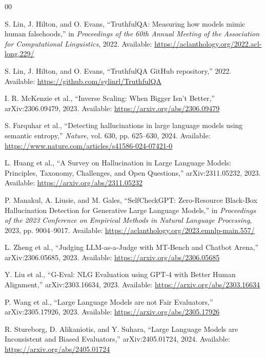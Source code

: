 \documentclass[conference]{IEEEtran}
\begin{document}
\clearpage
\begin{thebibliography}{00}

S. Lin, J. Hilton, and O. Evans, ``TruthfulQA: Measuring how models mimic human falsehoods,'' in \emph{Proceedings of the 60th Annual Meeting of the Association for Computational Linguistics}, 2022. Available: \url{https://aclanthology.org/2022.acl-long.229/}

S. Lin, J. Hilton, and O. Evans, ``TruthfulQA GitHub repository,'' 2022. Available: \url{https://github.com/sylinrl/TruthfulQA}

I. R. McKenzie et al., ``Inverse Scaling: When Bigger Isn't Better,'' arXiv:2306.09479, 2023. Available: \url{https://arxiv.org/abs/2306.09479}

S. Farquhar et al., ``Detecting hallucinations in large language models using semantic entropy,'' \emph{Nature}, vol. 630, pp. 625--630, 2024. Available: \url{https://www.nature.com/articles/s41586-024-07421-0}

L. Huang et al., ``A Survey on Hallucination in Large Language Models: Principles, Taxonomy, Challenges, and Open Questions,'' arXiv:2311.05232, 2023. Available: \url{https://arxiv.org/abs/2311.05232}

P. Manakul, A. Liusie, and M. Gales, ``SelfCheckGPT: Zero-Resource Black-Box Hallucination Detection for Generative Large Language Models,'' in \emph{Proceedings of the 2023 Conference on Empirical Methods in Natural Language Processing}, 2023, pp. 9004--9017. Available: \url{https://aclanthology.org/2023.emnlp-main.557/}

L. Zheng et al., ``Judging LLM-as-a-Judge with MT-Bench and Chatbot Arena,'' arXiv:2306.05685, 2023. Available: \url{https://arxiv.org/abs/2306.05685}

Y. Liu et al., ``G-Eval: NLG Evaluation using GPT-4 with Better Human Alignment,'' arXiv:2303.16634, 2023. Available: \url{https://arxiv.org/abs/2303.16634}

P. Wang et al., ``Large Language Models are not Fair Evaluators,'' arXiv:2305.17926, 2023. Available: \url{https://arxiv.org/abs/2305.17926}

R. Stureborg, D. Alikaniotis, and Y. Suhara, ``Large Language Models are Inconsistent and Biased Evaluators,'' arXiv:2405.01724, 2024. Available: \url{https://arxiv.org/abs/2405.01724}


\end{thebibliography}
\end{document}
